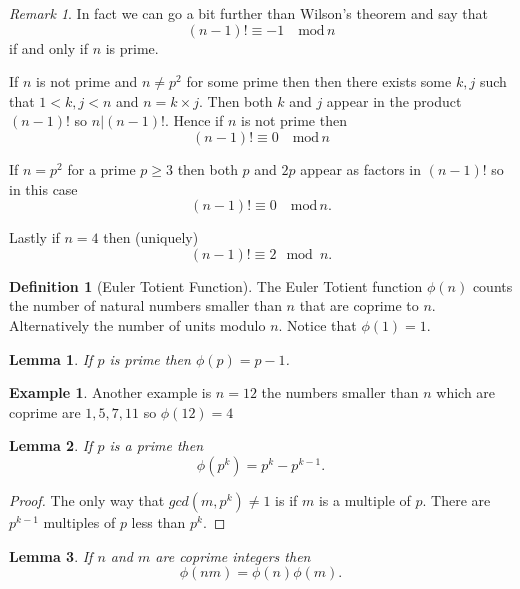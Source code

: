 \documentclass[
]{book}
\newtheorem{lemma}{Lemma}[chapter]
\theoremstyle{definition}
\newtheorem{definition}{Definition}[chapter]
\theoremstyle{definition}
\newtheorem{example}{Example}[chapter]
\theoremstyle{definition}
\theoremstyle{definition}
\theoremstyle{remark}
\newtheorem*{remark}{Remark}
\begin{document}
\begin{remark}
In fact we can go a bit further than Wilson's theorem and say that
\[ (n-1)! \equiv -1 \quad \mbox{mod} \, n\]
if and only if \(n\) is prime.

If \(n\) is not prime and \(n \neq p^2\) for some prime then then there exists some \(k, j\) such that \(1< k,j < n\) and \(n=k\times j\). Then both \(k\) and \(j\) appear in the product \((n-1)!\) so \(n|(n-1)!\). Hence if \(n\) is not prime then
\[ (n-1)! \equiv 0 \quad \mbox{mod} \, n  \]

If \(n=p^2\) for a prime \(p \geq 3\) then both \(p\) and \(2p\) appear as factors in \((n-1)!\) so in this case
\[ (n-1)! \equiv 0 \quad \mbox{mod}\, n.  \]

Lastly if \(n=4\) then (uniquely)
\[  (n-1)! \equiv 2 \mod n. \]
\end{remark}

\begin{definition}[Euler Totient Function]
The Euler Totient function \(\phi(n)\) counts the number of natural numbers smaller than \(n\) that are coprime to \(n\). Alternatively the number of units modulo \(n\). Notice that \(\phi(1)=1\).
\end{definition}

\begin{lemma}
If \(p\) is prime then \(\phi(p) = p-1\).
\end{lemma}

\begin{example}
Another example is \(n=12\) the numbers smaller than \(n\) which are coprime are \(1,5,7,11\) so \(\phi(12)=4\)
\end{example}

\begin{lemma}
If \(p\) is a prime then
\[ \phi(p^k) = p^k - p^{k-1}. \]
\end{lemma}

\begin{proof}
The only way that \(gcd(m,p^k) \neq 1\) is if \(m\) is a multiple of \(p\). There are \(p^{k-1}\) multiples of \(p\) less than \(p^k\).
\end{proof}

\begin{lemma}
If \(n\) and \(m\) are coprime integers then
\[ \phi(nm) = \phi(n)\phi(m). \]
\end{lemma}
\end{document}
